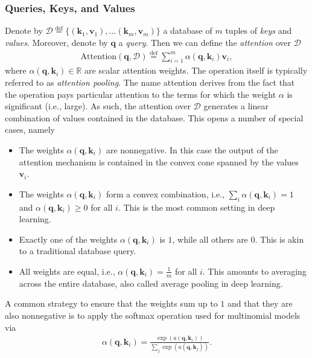 \documentclass[a4paper,12pt]{article}
\theoremstyle{definition}
\begin{document}
\subsubsection*{Queries, Keys, and Values}
Denote by $\mathcal{D} \stackrel{\mathrm{def}}{=} \{(\mathbf{k}_1, \mathbf{v}_1), \ldots (\mathbf{k}_m, \mathbf{v}_m)\}$ a database of $m$ tuples of \emph{keys} and \emph{values}.
Moreover, denote by $\mathbf{q}$ a \emph{query}. Then we can define the \emph{attention} over $\mathcal{D}$
\begin{equation*}
    \begin{aligned}
        \mathrm{Attention}(\mathbf{q}, \mathcal{D}) \stackrel{\mathrm{def}}{=} \sum_{i=1}^m \alpha(\mathbf{q}, \mathbf{k}_i) \mathbf{v}_i,
    \end{aligned}
\end{equation*}
where $\alpha(\mathbf{q}, \mathbf{k}_i) \in \mathbb{R}$ are scalar attention weights. The operation itself is typically referred to as \emph{attention pooling}.
The name attention derives from the fact that the operation pays particular attention to the terms for which the weight $\alpha$ is significant (i.e., large).
As such, the attention over $\mathcal{D}$ generates a linear combination of values contained in the database. This opens a number of special cases, namely
\begin{itemize}
    \item The weights $\alpha(\mathbf{q}, \mathbf{k}_i)$ are nonnegative. In this case the output of the attention mechanism is contained in the convex cone spanned by the values $\mathbf{v}_i$.
    \item The weights $\alpha(\mathbf{q}, \mathbf{k}_i)$ form a convex combination, i.e., $\sum_i \alpha(\mathbf{q}, \mathbf{k}_i) = 1$ and $\alpha(\mathbf{q}, \mathbf{k}_i) \geq 0$ for all $i$.
          This is the most common setting in deep learning.
    \item Exactly one of the weights $\alpha(\mathbf{q}, \mathbf{k}_i)$ is $1$, while all others are $0$. This is akin to a traditional database query.
    \item All weights are equal, i.e., $\alpha(\mathbf{q}, \mathbf{k}_i) = \frac{1}{m}$ for all $i$. This amounts to averaging across the entire database, also called average pooling in deep learning.
\end{itemize}
A common strategy to ensure that the weights sum up to $1$ and that they are also nonnegative is to apply the softmax operation used for multinomial models via
\begin{equation*}
    \begin{aligned}
        \alpha(\mathbf{q}, \mathbf{k}_i) = \frac{\exp(a(\mathbf{q}, \mathbf{k}_i))}{\sum_j \exp(a(\mathbf{q}, \mathbf{k}_j))}.
    \end{aligned}
\end{equation*}
\end{document}
